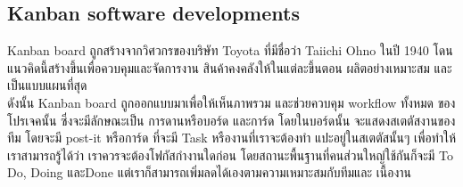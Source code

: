 \documentclass[12pt,oneside,openright,a4paper]{cpe-thai-project}
\begin{document}
\subsection{Kanban software developments} 
\hspace*{1cm}Kanban board ถูกสร้างจากวิศวกรของบริษัท Toyota ที่มีชื่อว่า Taiichi Ohno ในปี 1940 โดนแนวคิดนี้สร้างขึ้นเพื่อควบคุมและจัดการงาน สินค้าคงคลังให้ในแต่ละขึ้นตอน ผลิตอย่างเหมาะสม และเป็นแบบแผนที่สุด\\
\hspace*{1cm}ดังนั้น Kanban board ถูกออกแบบมาเพื่อให้เห็นภาพรวม และช่วยควบคุม workflow ทั้งหมด ของโปรเจคนั้น ซึ่งจะมีลักษณะเป็น การดานหรือบอร์ด และการ์ด โดยในบอร์ดนั้น จะแสดงสเตตัสงานของทีม โดยจะมี post-it หรือการ์ด ที่จะมี Task หรืองานที่เราจะต้องทำ แปะอยู่ในสเตตัสนั้นๆ เพื่อทำให้เราสามารถรู้ได้ว่า เราควรจะต้องโฟกัสกำงานใดก่อน โดยสถานะพื้นฐานที่คนส่วนใหญ่ใช้กันก็จะมี To Do, Doing และDone แต่เราก็สามารถเพิ่มลดได้เองตามความเหมาะสมกับทีมและ เนื้องาน
\end{document}
